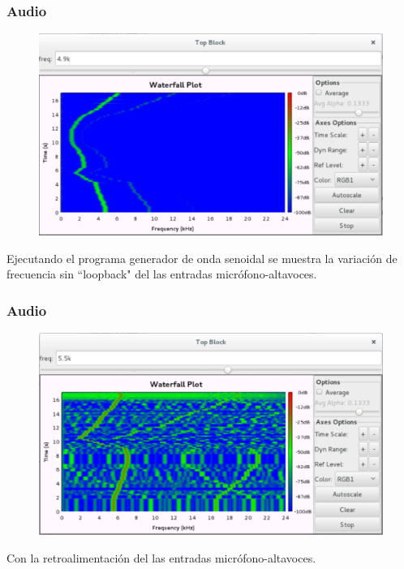 \begin{frame}[fragile]
\frametitle{Audio}
\justifying

\begin{figure}

\begin{center}
\includegraphics[scale=0.4]{lab3/pdf/lab39.pdf}

\end{center}

\end{figure}

\justifying
Ejecutando el programa generador de onda senoidal se muestra la
variación de frecuencia sin “loopback" del las entradas
micrófono-altavoces.

\end{frame}

\begin{frame}[fragile]
\frametitle{Audio}
\justifying

\begin{figure}

\begin{center}
\includegraphics[scale=0.5]{lab3/pdf/lab310.pdf}

\end{center}

\end{figure}

\justifying
Con la retroalimentación del las entradas micrófono-altavoces.

\end{frame}